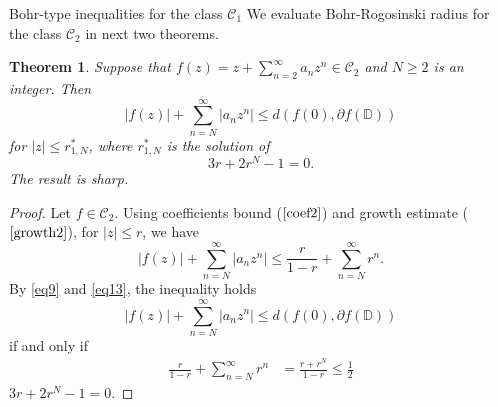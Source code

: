 \documentclass[12pt,a4paper,reqno]{amsart}
\theoremstyle{definition}
\theoremstyle{plain}
\newtheorem{theorem}[definition]{Theorem}
\numberwithin{equation}{section}
\begin{document}
\begin{section}{Bohr-type inequalities for the class $\mathcal{C}_1$}
\noindent
We evaluate Bohr-Rogosinski radius for the class $\mathcal{C}_2$ in next two theorems.
\begin{theorem}
Suppose that $f(z)=z + \sum_{n=2}^{\infty} a_n z^n \in \mathcal{C}_2$ and  $N\geq2$ is an integer. Then
\begin{equation} \label{2.2.3}
|f(z)|+ \sum_{n=N}^{\infty} |a_n z^n|  \le d(f(0), \partial{f(\mathbb{D})})
\end{equation}
for $|z| \le r^*_{1,N}$, where $r^*_{1,N}$ is the solution of
\[ 3 r + 2 r^N-1=0.\]
The result is sharp.
\end{theorem}
\begin{proof}
Let $f\in  \mathcal{C}_2$. Using
  coefficients bound  ($\ref{coef2}$) and growth estimate ($\ref{growth2}$), for $|z| \le r$, we have
\begin{equation}\label{eq13}
|f(z)|+ \sum_{n=N}^{\infty} |a_n z^n|  \le
\frac{r}{1-r}  + \sum_{n=N}^{\infty} r^{n}.
\end{equation}
\noindent
By \eqref{eq9} and \eqref{eq13}, the  inequality  holds
\begin{equation*}
|f(z)|+ \sum_{n=N}^{\infty} |a_n z^n|  \le  d(f(0), \partial{f(\mathbb{D})})
\end{equation*}
if and only if
\begin{align*}
  \frac{r}{1-r}  + \sum_{n=N}^{\infty} r^{n}&=\frac{r+r^N}{1-r} \le   \frac{1}{2}
\end{align*}
 $ 3 r + 2 r^N-1=0.$

\end{proof}
\end{section}
\end{document}
